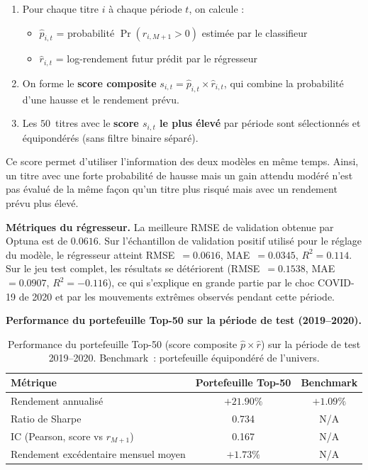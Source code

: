 \documentclass[11pt,a4paper]{article}
\begin{document}
\begin{enumerate}
    \item Pour chaque titre $i$ à chaque période $t$, on calcule :
    \begin{itemize}
        \item $\hat{p}_{i,t}$ = probabilité $\Pr(r_{i,M+1} > 0)$ estimée par le classifieur
        \item $\hat{r}_{i,t}$ = log-rendement futur prédit par le régresseur
    \end{itemize}
    \item On forme le \textbf{score composite} $s_{i,t} = \hat{p}_{i,t} \times \hat{r}_{i,t}$, qui combine la probabilité d'une hausse et le rendement prévu.
    \item Les $50$~titres avec le \textbf{score $s_{i,t}$ le plus élevé} par période sont sélectionnés et équipondérés (sans filtre binaire séparé).
\end{enumerate}

Ce score permet d'utiliser l'information des deux modèles en même temps. Ainsi, un titre avec une forte probabilité de hausse mais un gain attendu modéré n'est pas évalué de la même façon qu'un titre plus risqué mais avec un rendement prévu plus élevé.

\textbf{Métriques du régresseur.} La meilleure RMSE de validation obtenue par Optuna est de $0.0616$. Sur l'échantillon de validation positif utilisé pour le réglage du modèle, le régresseur atteint RMSE~$= 0.0616$, MAE~$= 0.0345$, $R^2 = 0.114$. Sur le jeu test complet, les résultats se détériorent (RMSE~$= 0.1538$, MAE~$= 0.0907$, $R^2 = -0.116$), ce qui s'explique en grande partie par le choc COVID-19 de 2020 et par les mouvements extrêmes observés pendant cette période.

\textbf{Performance du portefeuille Top-50 sur la période de test (2019--2020).}

\begin{table}[H]
\centering
\begin{tabular}{lcc}
\toprule
\textbf{Métrique} & \textbf{Portefeuille Top-50} & \textbf{Benchmark} \\
\midrule
Rendement annualisé & $+21.90\%$ & $+1.09\%$ \\
Ratio de Sharpe     & 0.734      & N/A \\
IC (Pearson, score vs $r_{M+1}$) & 0.167 & N/A \\
Rendement excédentaire mensuel moyen & $+1.73\%$ & N/A \\
\bottomrule
\end{tabular}
\caption{Performance du portefeuille Top-50 (score composite $\hat{p}\times\hat{r}$) sur la période de test 2019--2020. Benchmark~: portefeuille équipondéré de l'univers.}
\label{tab:portfolio_perf}
\end{table}
\end{document}
